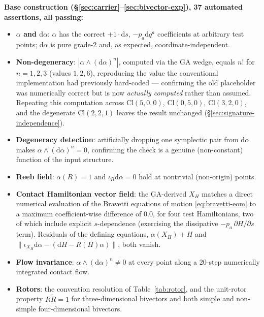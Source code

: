 \documentclass[11pt]{article}
\newcommand{\Cl}{\mathrm{Cl}}
\newcommand{\dif}{\mathrm{d}}
\begin{document}
\textbf{Base construction (\S\ref{sec:carrier}--\ref{sec:bivector-exp}), 37 automated assertions, all passing:}
\begin{itemize}[leftmargin=1.4em]
\item \textbf{$\alpha$ and $\dif\alpha$}: $\alpha$ has the correct $+1\cdot\dif s$, $-p_a\dif q^a$ coefficients at arbitrary test points; $\dif\alpha$ is pure grade-2 and, as expected, coordinate-independent.
\item \textbf{Non-degeneracy}: $|\alpha\wedge(\dif\alpha)^n|$, computed via the GA wedge, equals $n!$ for $n=1,2,3$ (values $1,2,6$), reproducing the value the conventional implementation had previously hard-coded — confirming the old placeholder was numerically correct but is now \emph{actually computed} rather than assumed. Repeating this computation across $\Cl(5,0,0)$, $\Cl(0,5,0)$, $\Cl(3,2,0)$, and the degenerate $\Cl(2,2,1)$ leaves the result unchanged (\S\ref{sec:signature-independence}).
\item \textbf{Degeneracy detection}: artificially dropping one symplectic pair from $\dif\alpha$ makes $\alpha\wedge(\dif\alpha)^n = 0$, confirming the check is a genuine (non-constant) function of the input structure.
\item \textbf{Reeb field}: $\alpha(R)=1$ and $\iota_R\dif\alpha = 0$ hold at nontrivial (non-origin) points.
\item \textbf{Contact Hamiltonian vector field}: the GA-derived $X_H$ matches a direct numerical evaluation of the Bravetti equations of motion \eqref{eq:bravetti-eom} to a maximum coefficient-wise difference of $0.0$, for four test Hamiltonians, two of which include explicit $s$-dependence (exercising the dissipative $-p_a\,\partial H/\partial s$ term). Residuals of the defining equations, $\alpha(X_H)+H$ and $\|\iota_{X_H}\dif\alpha-(\dif H - R(H)\alpha)\|$, both vanish.
\item \textbf{Flow invariance}: $\alpha\wedge(\dif\alpha)^n \neq 0$ at every point along a 20-step numerically integrated contact flow.
\item \textbf{Rotors}: the convention resolution of Table~\ref{tab:rotor}, and the unit-rotor property $R\tilde R=1$ for three-dimensional bivectors and both simple and non-simple four-dimensional bivectors.
\end{itemize}
\end{document}
